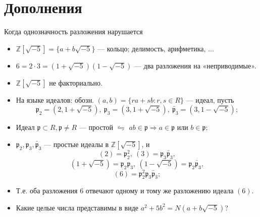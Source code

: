 \documentclass[serif, aspectratio=169]{beamer}
\begin{document}
\section{Дополнения}

\begin{frame}{Когда однозначность разложения нарушается}
    \begin{itemize}
        \item $\mathbb{Z}[\sqrt{-5}]=\{a+b\sqrt{-5}\}$ --- кольцо; делимость, арифметика, $\dots$
        \item $6 = 2\cdot3 = (1+\sqrt{-5})(1-\sqrt{-5})$ --- два разложения на «неприводимые».
        \item $\mathbb{Z}[\sqrt{-5}]$ не факториально.
        \item На языке идеалов: обозн. $(a,b)=\{ra+sb: r,s\in R\}$ --- идеал, пусть
        \[\mathfrak p_2=(2,1+\sqrt{-5}),\ \mathfrak p_3=(3,1+\sqrt{-5}),\ \bar{\mathfrak p}_3=(3,1-\sqrt{-5});\]
        \item Идеал $\mathfrak p\subset R, \mathfrak p \neq R$ --- простой $\leftrightharpoons$ $ab\in\mathfrak p \Rightarrow a\in\mathfrak p$ или $b\in\mathfrak p;$
        \item $\mathfrak p_2, \mathfrak p_3, \bar{\mathfrak p}_3$ --- простые идеалы в $\mathbb{Z}[\sqrt{-5}]$, и
        \[(2)=\mathfrak p_2^2,\ (3)=\mathfrak p_3\bar{\mathfrak p}_3,\]
        \[(1+\sqrt{-5})=\mathfrak p_2\mathfrak p_3,\ (1-\sqrt{-5})=\mathfrak p_2\bar{\mathfrak p}_3,\]
        \[(6)=\mathfrak p_2^2\mathfrak p_3\bar{\mathfrak p}_3;\]
        \item Т.е. оба разложения $6$ отвечают одному и тому же разложению идеала $(6)$.
        \item Какие целые числа представимы в виде $a^2+5b^2=N(a+b\sqrt{-5})$?
    \end{itemize}
\end{frame}
\end{document}
